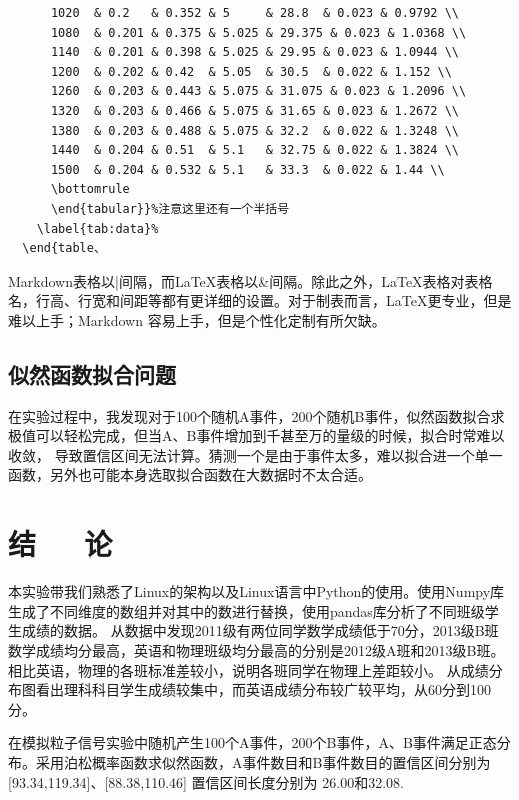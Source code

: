 \documentclass[10pt,a4paper,twoside,UTF8]{ctexart}
\begin{document}
\begin{lstlisting}
	  1020  & 0.2   & 0.352 & 5     & 28.8  & 0.023 & 0.9792 \\
	  1080  & 0.201 & 0.375 & 5.025 & 29.375 & 0.023 & 1.0368 \\
	  1140  & 0.201 & 0.398 & 5.025 & 29.95 & 0.023 & 1.0944 \\
	  1200  & 0.202 & 0.42  & 5.05  & 30.5  & 0.022 & 1.152 \\
	  1260  & 0.203 & 0.443 & 5.075 & 31.075 & 0.023 & 1.2096 \\
	  1320  & 0.203 & 0.466 & 5.075 & 31.65 & 0.023 & 1.2672 \\
	  1380  & 0.203 & 0.488 & 5.075 & 32.2  & 0.022 & 1.3248 \\
	  1440  & 0.204 & 0.51  & 5.1   & 32.75 & 0.022 & 1.3824 \\
	  1500  & 0.204 & 0.532 & 5.1   & 33.3  & 0.022 & 1.44 \\
	  \bottomrule
	  \end{tabular}}%注意这里还有一个半括号
	\label{tab:data}%
  \end{table、
\end{lstlisting}


Markdown表格以|间隔，而LaTeX表格以\&间隔。除此之外，LaTeX表格对表格名，行高、行宽和间距等都有更详细的设置。对于制表而言，LaTeX更专业，但是难以上手；Markdown
容易上手，但是个性化定制有所欠缺。

\subsection{似然函数拟合问题}
在实验过程中，我发现对于100个随机A事件，200个随机B事件，似然函数拟合求极值可以轻松完成，但当A、B事件增加到千甚至万的量级的时候，拟合时常难以收敛，
导致置信区间无法计算。猜测一个是由于事件太多，难以拟合进一个单一函数，另外也可能本身选取拟合函数在大数据时不太合适。

\section{结~~~论}
本实验带我们熟悉了Linux的架构以及Linux语言中Python的使用。使用Numpy库生成了不同维度的数组并对其中的数进行替换，使用pandas库分析了不同班级学生成绩的数据。
从数据中发现2011级有两位同学数学成绩低于70分，2013级B班数学成绩均分最高，英语和物理班级均分最高的分别是2012级A班和2013级B班。相比英语，物理的各班标准差较小，说明各班同学在物理上差距较小。
从成绩分布图看出理科科目学生成绩较集中，而英语成绩分布较广较平均，从60分到100分。

在模拟粒子信号实验中随机产生100个A事件，200个B事件，A、B事件满足正态分布。采用泊松概率函数求似然函数，A事件数目和B事件数目的置信区间分别为
[93.34,119.34]、[88.38,110.46] 置信区间长度分别为 26.00和32.08.
\newpage
\end{document}
